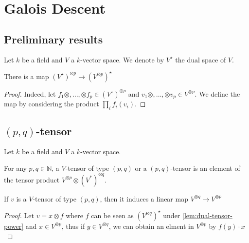 \section{Galois Descent}

\subsection{Preliminary results}
Let $k$ be a field and $V$ a $k$-vector space. We denote by $V^{\star}$ the dual space of $V$.

\begin{lemma}\label{lem:dual-tensor-power}
  There is a map $(V^{\star})^{\otimes p} \to (V^{\otimes p})^\star$
  \leanok
\end{lemma}
\begin{proof}
Indeed, let $f_1 \otimes, \dots, \otimes f_p \in (V^{\star})^{\otimes p}$ and $v_1 \otimes, \dots, \otimes v_p \in V^{\otimes p}$. We define the map by considering the product $\prod_{i} f_i (v_i)$.
\end{proof}

\subsection{$(p, q)$-tensor}\label{sec:p-q-tensor}

Let $k$ be a field and $V$ a $k$-vector space.

\begin{definition}\label{def:tensor-of-type}%
  For any $p, q \in \mathbb{N}$, a $V$-tensor of type $(p,q)$ or a $(p, q)$-tensor is an element of the tensor product $V^{\otimes p} \otimes {(V^*)}^{\otimes q}$.
  \leanok%
\end{definition}


\begin{lemma}
  If $v$ is a $V$-tensor of type $(p,q)$, then it induces a linear map $V^{\otimes q}\to V^{\otimes p}$
\end{lemma}
\begin{proof}
  Let $v = x \otimes f$ where $f$ can be seen as ${(V^{\otimes q})}^{\star}$ under
  \cref{lem:dual-tensor-power} and $x \in V^{\otimes p}$, thus if $y \in V^{\otimes q}$, we can obtain an elment in $V^{\otimes p}$ by $f(y)\cdot x$
\end{proof}

